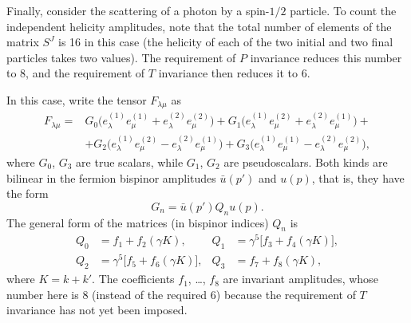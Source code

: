 Finally, consider the scattering of a photon by a spin-$1/2$ particle. To count the independent helicity amplitudes, note that the total number of elements of the matrix $S^J$ is 16 in this case (the helicity of each of the two initial and two final particles takes two values). The requirement of $P$ invariance reduces this number to 8, and the requirement of $T$ invariance then reduces it to 6.

In this case, write the tensor $F_{\lambda\mu}$ as
\begin{equation}
\begin{aligned}
F_{\lambda\mu}={}&G_0\bigl(e_\lambda^{(1)}e_\mu^{(1)}
+e_\lambda^{(2)}e_\mu^{(2)}\bigr)
+G_1\bigl(e_\lambda^{(1)}e_\mu^{(2)}
+e_\lambda^{(2)}e_\mu^{(1)}\bigr)+\\
&+G_2\bigl(e_\lambda^{(1)}e_\mu^{(2)}
-e_\lambda^{(2)}e_\mu^{(1)}\bigr)
+G_3\bigl(e_\lambda^{(1)}e_\mu^{(1)}
-e_\lambda^{(2)}e_\mu^{(2)}\bigr),
\end{aligned}
\tag{70.11}
\end{equation}
where $G_0$, $G_3$ are true scalars, while $G_1$, $G_2$ are pseudoscalars. Both kinds are bilinear in the fermion bispinor amplitudes $\bar u(p')$ and $u(p)$, that is, they have the form
\begin{equation}
G_n=\bar u(p')Q_nu(p).
\tag{70.12}
\end{equation}
The general form of the matrices (in bispinor indices) $Q_n$ is
\begin{equation}
\begin{aligned}
Q_0&=f_1+f_2(\gamma K),
&Q_1&=\gamma^5\bigl[f_3+f_4(\gamma K)\bigr],\\
Q_2&=\gamma^5\bigl[f_5+f_6(\gamma K)\bigr],
&Q_3&=f_7+f_8(\gamma K),
\end{aligned}
\tag{70.13}
\end{equation}
where $K=k+k'$. The coefficients $f_1$, \ldots, $f_8$ are invariant amplitudes, whose number here is 8 (instead of the required 6) because the requirement of $T$ invariance has not yet been imposed.


